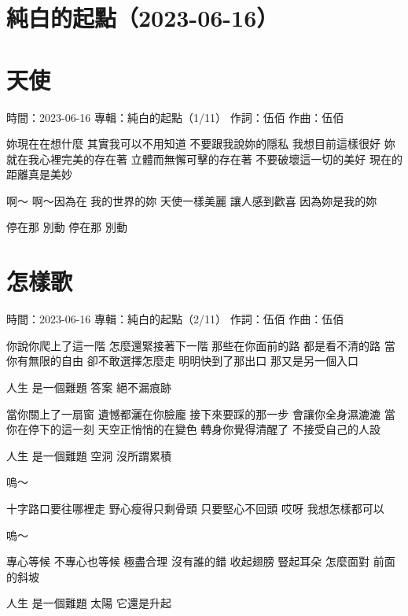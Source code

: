 \documentclass[UTF8,a4paper,oneside,twocolumn,12pt]{ctexbook}
\newcommand{\infopair}[2]{\textbullet #1：#2}
\newcommand{\zc}[1][伍佰]{\infopair{作詞}{#1}}
\newcommand{\zq}[1][伍佰]{\infopair{作曲}{#1}}
\newcommand{\zj}[1]{\infopair{專輯}{#1}}
\newcommand{\sj}[1]{\infopair{時間}{#1}}
\newenvironment{info}{\begin{flushleft}\kaishu
	}
	{\end{flushleft}\normalsize\yahei\par}
\newenvironment{lyric}{
	}
{}
\begin{document}
\section*{純白的起點（2023-06-16）}%
\section{天使}
\begin{info}
	\sj{2023-06-16}
	\zj{純白的起點（1/11）}
	\zc
	\zq
\end{info}
\begin{lyric}
	妳現在在想什麼
	其實我可以不用知道
	不要跟我說妳的隱私
	我想目前這樣很好
	妳就在我心裡完美的存在著
	立體而無懈可擊的存在著
	不要破壞這一切的美好
	現在的距離真是美妙

	啊～
	啊～因為在
	我的世界的妳
	天使一樣美麗
	讓人感到歡喜
	因為妳是我的妳

	停在那
	別動
	停在那
	別動
\end{lyric}

\section{怎樣歌}%
\begin{info}
	\sj{2023-06-16}
	\zj{純白的起點（2/11）}
	\zc
	\zq
\end{info}
\begin{lyric}
	你說你爬上了這一階 怎麼還緊接著下一階
	那些在你面前的路 都是看不清的路
	當你有無限的自由 卻不敢選擇怎麼走
	明明快到了那出口 那又是另一個入口

	人生 是一個難題
	答案 絕不漏痕跡

	當你關上了一扇窗 遺憾都灑在你臉龐
	接下來要踩的那一步 會讓你全身濕漉漉
	當你在停下的這一刻 天空正悄悄的在變色
	轉身你覺得清醒了 不接受自己的人設

	人生 是一個難題
	空洞 沒所謂累積

	嗚～

	十字路口要往哪裡走
	野心瘦得只剩骨頭
	只要堅心不回頭 哎呀
	我想怎樣都可以

	嗚～

	專心等候 不專心也等候
	極盡合理 沒有誰的錯
	收起翅膀 豎起耳朵
	怎麼面對 前面的斜坡

	人生 是一個難題
	太陽 它還是升起
\end{lyric}
\end{document}
